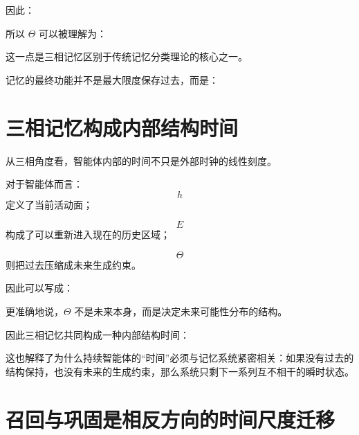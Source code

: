因此：
\begin{statementbox}
\centering
{}
\end{statementbox}

所以 $\Theta$ 可以被理解为：
\begin{statementbox}
\centering
{}
\end{statementbox}

这一点是三相记忆区别于传统记忆分类理论的核心之一。

记忆的最终功能并不是最大限度保存过去，而是：
\begin{statementbox}
\centering
{}
\end{statementbox}

\section{三相记忆构成内部结构时间}

从三相角度看，智能体内部的时间不只是外部时钟的线性刻度。

对于智能体而言：
\[
h
\]
定义了当前活动面；

\[
E
\]
构成了可以重新进入现在的历史区域；

\[
\Theta
\]
则把过去压缩成未来生成约束。

因此可以写成：
\begin{statementbox}
\centering
{}
\end{statementbox}

更准确地说，$\Theta$ 不是未来本身，而是决定未来可能性分布的结构。

因此三相记忆共同构成一种内部结构时间：
\begin{statementbox}
\centering
{}
\end{statementbox}

这也解释了为什么持续智能体的“时间”必须与记忆系统紧密相关：如果没有过去的结构保持，也没有未来的生成约束，那么系统只剩下一系列互不相干的瞬时状态。

\section{召回与巩固是相反方向的时间尺度迁移}


